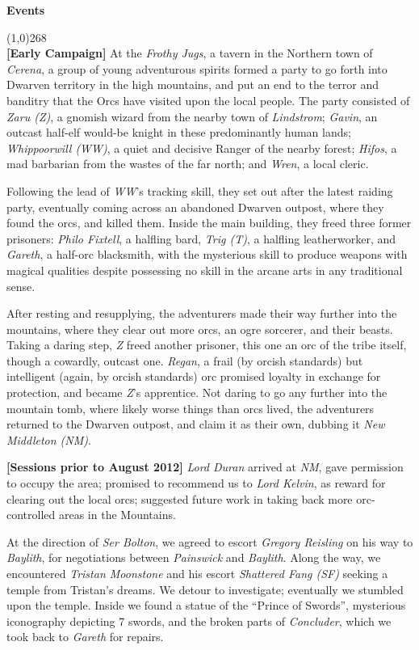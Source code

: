 \documentclass[letterpaper]{article}
\newlength\tindent
\newcommand{\colline}{\line(1,0){268} \\}
\newcommand{\e}[1]{\emph{#1}}
\newcommand{\B}[1]{\textbf{#1}}
\newenvironment{notesection}[1]
{ {\huge \B{#1}} \par
\vspace{-0.75em}
\colline
\begingroup\fontsize{9pt}{12pt}\selectfont}
{\endgroup}
\begin{document}
\begin{notesection}{Events}
\setlength{\parindent}{\tindent}
\B{[Early Campaign]} At the \e{Frothy Jugs}, a tavern in the Northern town of \e{Cerena}, a group of young adventurous spirits formed a party to go forth into Dwarven territory in the high mountains, and put an end to the terror and banditry that the Orcs have visited upon the local people. The party consisted of \e{Zaru (Z)}, a gnomish wizard from the nearby town of \e{Lindstrom}; \e{Gavin}, an outcast half-elf would-be knight in these predominantly human lands; \e{Whippoorwill (WW)}, a quiet and decisive Ranger of the nearby forest; \e{Hifos}, a mad barbarian from the wastes of the far north; and \e{Wren}, a local cleric.

Following the lead of \e{WW}'s tracking skill, they set out after the latest raiding party, eventually coming across an abandoned Dwarven outpost, where they found the orcs, and killed them.  Inside the main building, they freed three former prisoners: \e{Philo Fixtell}, a halfling bard, \e{Trig (T)}, a halfling leatherworker, and \e{Gareth}, a half-orc blacksmith, with the mysterious skill to produce weapons with magical qualities despite possessing no skill in the arcane arts in any traditional sense.

After resting and resupplying, the adventurers made their way further into the mountains, where they clear out more orcs, an ogre sorcerer, and their beasts. Taking a daring step, \e{Z} freed another prisoner, this one an orc of the tribe itself, though a cowardly, outcast one.  \e{Regan}, a frail (by orcish standards) but intelligent (again, by orcish standards) orc promised loyalty in exchange for protection, and became \e{Z}'s apprentice. Not daring to go any further into the mountain tomb, where likely worse things than orcs lived, the adventurers returned to the Dwarven outpost, and claim it as their own, dubbing it \e{New Middleton (NM)}.

\B{[Sessions prior to August 2012]} \e{Lord Duran} arrived at \e{NM}, gave permission to occupy the area; promised to recommend us to \e{Lord Kelvin}, as reward for clearing out the local orcs; suggested future work in taking back more orc-controlled areas in the Mountains. 

At the direction of \e{Ser Bolton}, we agreed to escort \e{Gregory Reisling} on his way to \e{Baylith}, for negotiations between \e{Painswick} and \e{Baylith}.  Along the way, we encountered \e{Tristan Moonstone} and his escort \e{Shattered Fang (SF)} seeking a temple from Tristan's dreams. We detour to investigate; eventually we stumbled upon the temple.  Inside we found a statue of the ``Prince of Swords'', mysterious iconography depicting 7 swords, and the broken parts of \e{Concluder}, which we took back to \e{Gareth} for repairs.


\end{notesection}
\end{document}
